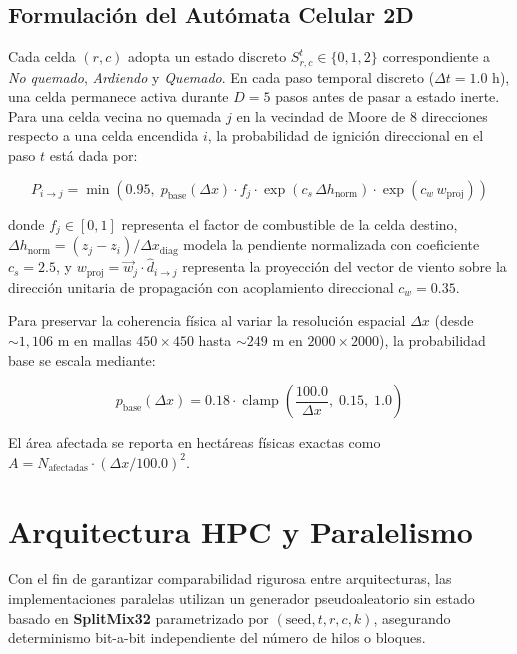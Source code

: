 \documentclass[twocolumn,10pt]{article}
\begin{document}
\subsection{Formulación del Autómata Celular 2D}
Cada celda $(r, c)$ adopta un estado discreto $S_{r,c}^t \in \{0, 1, 2\}$ correspondiente a \textit{No quemado}, \textit{Ardiendo} y \textit{Quemado}. En cada paso temporal discreto ($\Delta t = 1.0\text{ h}$), una celda permanece activa durante $D = 5$ pasos antes de pasar a estado inerte. Para una celda vecina no quemada $j$ en la vecindad de Moore de 8 direcciones respecto a una celda encendida $i$, la probabilidad de ignición direccional en el paso $t$ está dada por:

\begin{equation}
P_{i \to j} = \min\!\left(0.95,\; p_{\text{base}}(\Delta x)\cdot f_j \cdot \exp(c_s\,\Delta h_{\text{norm}}) \cdot \exp(c_w\, w_{\text{proj}})\right)
\end{equation}

donde $f_j \in [0, 1]$ representa el factor de combustible de la celda destino, $\Delta h_{\text{norm}} = (z_j - z_i)/\Delta x_{\text{diag}}$ modela la pendiente normalizada con coeficiente $c_s = 2.5$, y $w_{\text{proj}} = \vec{w}_j \cdot \hat{d}_{i \to j}$ representa la proyección del vector de viento sobre la dirección unitaria de propagación con acoplamiento direccional $c_w = 0.35$.

Para preservar la coherencia física al variar la resolución espacial $\Delta x$ (desde $\sim 1{,}106\text{ m}$ en mallas $450\times 450$ hasta $\sim 249\text{ m}$ en $2000\times 2000$), la probabilidad base se escala mediante:

\begin{equation}
p_{\text{base}}(\Delta x) = 0.18 \cdot \operatorname{clamp}\!\left(\frac{100.0}{\Delta x},\; 0.15,\; 1.0\right)
\end{equation}

El área afectada se reporta en hectáreas físicas exactas como $A = N_{\text{afectadas}} \cdot (\Delta x / 100.0)^2$.

\section{Arquitectura HPC y Paralelismo}

Con el fin de garantizar comparabilidad rigurosa entre arquitecturas, las implementaciones paralelas utilizan un generador pseudoaleatorio sin estado basado en \textbf{SplitMix32} parametrizado por $(\text{seed}, t, r, c, k)$, asegurando determinismo bit-a-bit independiente del número de hilos o bloques.
\end{document}
